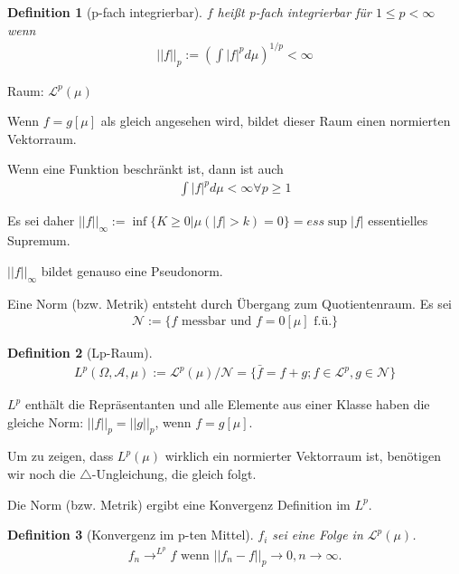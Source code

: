 \documentclass[]{article}
\newtheorem{definition}{Definition}
\begin{document}
\begin{definition}[p-fach integrierbar]
	$f$ heißt p-fach integrierbar für $1\leq p < \infty$ wenn
	\begin{align*}
		||f||_p := \left( \int |f|^p d\mu \right)^{1/p} < \infty
	\end{align*}
\end{definition}

Raum: $\mathcal{L}^p(\mu)$

Wenn $f=g[\mu]$ als gleich angesehen wird, bildet dieser Raum einen normierten Vektorraum.

Wenn eine Funktion beschränkt ist, dann ist auch
\begin{align*}
	\int |f|^p d\mu < \infty \forall p \geq 1
\end{align*}

Es sei daher $||f||_\infty := \inf\{K\geq 0 | \mu(|f|>k)=0\} = ess\sup |f|$ essentielles Supremum.

$||f||_\infty$ bildet genauso eine Pseudonorm.

Eine Norm (bzw. Metrik) entsteht durch Übergang zum Quotientenraum. Es sei
\begin{align*}
	\mathcal{N} := \{f \text{ messbar und } f = 0 [\mu] \text{ f.ü.}\}
\end{align*}

\begin{definition}[Lp-Raum]
	\begin{align*}
		L^p(\Omega, \mathcal{A}, \mu) := \mathcal{L}^p(\mu) / \mathcal{N} = \{\bar{f} = f + g; f\in\mathcal{L}^p, g \in \mathcal{N}\}
	\end{align*}
\end{definition}	
$L^p$ enthält die Repräsentanten und alle Elemente aus einer Klasse haben die gleiche Norm: $||f||_p = ||g||_p$, wenn $f=g[\mu]$.

Um zu zeigen, dass $L^p(\mu)$ wirklich ein normierter Vektorraum ist, benötigen wir noch die $\triangle$-Ungleichung, die gleich folgt.

Die Norm (bzw. Metrik) ergibt eine Konvergenz Definition im $L^p$.

\begin{definition}[Konvergenz im p-ten Mittel]
	$f_i$ sei eine Folge in $\mathcal{L}^p(\mu)$.
	\begin{align*}
		f_n \rightarrow^{L^p} f \text{ wenn } ||f_n - f||_p \rightarrow 0, n\rightarrow \infty.
	\end{align*}
\end{definition}
\end{document}

